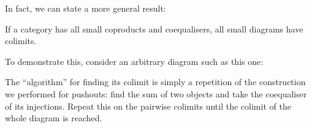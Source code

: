 In fact, we can state a more general result:

\begin{proposition}
If a category has all small coproducts and coequalisers, all small diagrams have
colimits.
\end{proposition}

To demonstrate this, consider an arbitrary diagram such as this one:

\begin{center}
\end{center}

The ``algorithm'' for finding its colimit is simply a repetition of the
construction we performed for pushouts: find the sum of two objects and take the
coequaliser of its injections. Repeat this on the pairwise colimits until the
colimit of the whole diagram is reached.

\begin{center}
\begin{minipage}{0.23\textwidth}


\end{minipage}\hfill\vline\hfill%
\begin{minipage}{0.33\textwidth}


\end{minipage}\hfill\vline\hfill%
\begin{minipage}{0.4\textwidth}


\end{minipage}
\end{center}
